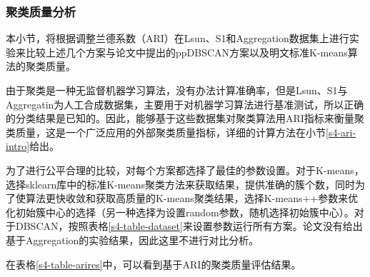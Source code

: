 \subsubsection{聚类质量分析}
本小节，将根据调整兰德系数（ARI）在Lsun、S1和Aggregation数据集上进行实验来比较上述几个方案与论文\cite{bozdemir2021privacy}中提出的ppDBSCAN方案以及明文标准K-means算法的聚类质量。

由于聚类是一种无监督机器学习算法，没有办法计算准确率，但是Lsun、S1与Aggregatin为人工合成数据集，主要用于对机器学习算法进行基准测试，所以正确的分类结果是已知的。因此，能够基于这些数据集对聚类算法用ARI指标来衡量聚类质量，这是一个广泛应用的外部聚类质量指标\cite{vinh2009information,arbelaitz2013extensive}，详细的计算方法在小节\ref{s4-ari-intro}给出。

为了进行公平合理的比较，对每个方案都选择了最佳的参数设置。对于K-means，选择sklearn库中的标准K-means聚类方法\cite{buitinck2013api}来获取结果，提供准确的簇个数，同时为了使算法更快收敛和获取高质量的K-means聚类结果，选择K-means++参数来优化初始簇中心的选择（另一种选择为设置random参数，随机选择初始簇中心）。对于DBSCAN，按照表格\ref{s4-table-dataset}来设置参数运行所有方案。论文\cite{bozdemir2021privacy}没有给出基于Aggregation的实验结果，因此这里不进行对比分析。

\begin{table}[htbp]
	\centering
	\renewcommand{\arraystretch}{1.3}
	\caption{聚类质量评估}
	\label{s4-table-arires}
\end{table}

在表格\ref{s4-table-arires}中，可以看到基于ARI的聚类质量评估结果。

